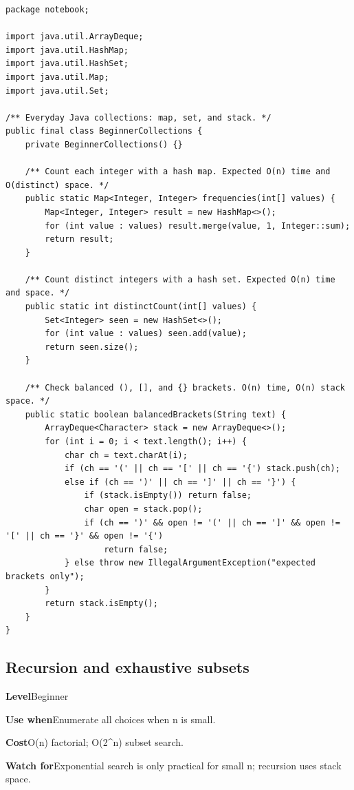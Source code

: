 \documentclass[10pt,letterpaper]{article}
\newcommand{\entrylabel}[1]{\textcolor{accent}{\bfseries #1}}
\begin{document}
\begin{lstlisting}
package notebook;

import java.util.ArrayDeque;
import java.util.HashMap;
import java.util.HashSet;
import java.util.Map;
import java.util.Set;

/** Everyday Java collections: map, set, and stack. */
public final class BeginnerCollections {
    private BeginnerCollections() {}

    /** Count each integer with a hash map. Expected O(n) time and O(distinct) space. */
    public static Map<Integer, Integer> frequencies(int[] values) {
        Map<Integer, Integer> result = new HashMap<>();
        for (int value : values) result.merge(value, 1, Integer::sum);
        return result;
    }

    /** Count distinct integers with a hash set. Expected O(n) time and space. */
    public static int distinctCount(int[] values) {
        Set<Integer> seen = new HashSet<>();
        for (int value : values) seen.add(value);
        return seen.size();
    }

    /** Check balanced (), [], and {} brackets. O(n) time, O(n) stack space. */
    public static boolean balancedBrackets(String text) {
        ArrayDeque<Character> stack = new ArrayDeque<>();
        for (int i = 0; i < text.length(); i++) {
            char ch = text.charAt(i);
            if (ch == '(' || ch == '[' || ch == '{') stack.push(ch);
            else if (ch == ')' || ch == ']' || ch == '}') {
                if (stack.isEmpty()) return false;
                char open = stack.pop();
                if (ch == ')' && open != '(' || ch == ']' && open != '[' || ch == '}' && open != '{')
                    return false;
            } else throw new IllegalArgumentException("expected brackets only");
        }
        return stack.isEmpty();
    }
}
\end{lstlisting}
\subsection{Recursion and exhaustive subsets}
\begin{guidebox}\small
\entrylabel{Level}\quad Beginner\par
\entrylabel{Use when}\quad Enumerate all choices when n is small.\par
\entrylabel{Cost}\quad O(n) factorial; O(2\textasciicircum{}n) subset search.\par
\entrylabel{Watch for}\quad Exponential search is only practical for small n; recursion uses stack space.\par
\end{guidebox}
\end{document}
